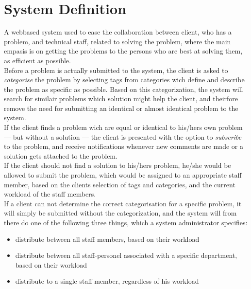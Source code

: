 \section{System Definition}
\label{sec:systemdefinition}


A webbased system used to ease the collaboration between client, who has a problem, and technical staff, related to solving the problem, where the main empasis is on getting the problems to the persons who are best at solving them, as efficient as possible. \\


Before a problem is actually submitted to the system, the client is asked to \textit{categorise} the problem by selecting tags from categories wich define and describe the problem as specific as possible. Based on this categorization, the system will search for similair problems which solution might help the client, and theirfore remove the need for submitting an identical or almost identical problem to the system.\\

If the client finds a problem wich are equal or identical to his/hers own problem --- but without a solution --- the client is presented with the option to \textit{subscribe} to the problem, and receive notifications whenever new comments are made or a solution gets attached to the problem. \\

If the client should not find a solution to his/hers problem, he/she would be allowed to submit the problem, which would be assigned to an appropriate staff member, based on the clients selection of tags and categories, and the current workload of the staff members. \\

If a client can not determine the correct categorisation for a specific problem, it will simply be submitted without the categorization, and the system will from there do one of the following three things, which a system administrator specifies:

\begin{itemize}
	\item distribute between all staff members, based on their workload
	\item distribute between all staff-personel associated with a specific department, based on their workload
	\item distribute to a single staff member, regardless of his workload
\end{itemize}

